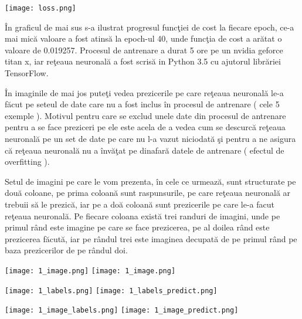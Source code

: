 \begin{center}
\texttt{[image: loss.png]}
\end{center}

\^{I}n graficul de mai sus s-a ilustrat progresul func\c{t}iei de cost la fiecare epoch, ce-a mai mic\u{a} valoare a fost atins\u{a} la epoch-ul 40, unde func\c{t}ia de cost a ar\u{a}tat o valoare de 0.019257. Procesul de antrenare a durat 5 ore pe un nvidia geforce titan x, iar re\c{t}eaua neuronal\u{a} a fost scris\u{a} in Python 3.5 cu ajutorul libr\u{a}riei TensorFlow.

\^{I}n imaginile de mai jos pute\c{t}i vedea prezicerile pe care re\c{t}eaua neuronal\u{a} le-a f\u{a}cut pe seteul de date care nu a fost inclus \^{i}n procesul de antrenare ( cele 5 exemple ). Motivul pentru care se exclud unele date din procesul de antrenare pentru a se face preziceri pe ele este acela de a vedea cum se descurc\u{a} re\c{t}eaua neuronal\u{a} pe un set de date pe care nu l-a vazut niciodat\u{a} \c{s}i pentru a ne asigura c\u{a} re\c{t}eaua neuronal\u{a} nu a \^{i}nv\u{a}\c{t}at pe dinafar\u{a} datele de antrenare ( efectul de overfitting ).

\par

Setul de imagini pe care le vom prezenta, \^{i}n cele ce urmeaz\u{a}, sunt structurate pe dou\u{a} coloane, pe prima coloan\u{a} sunt raspunsurile, pe care re\c{t}eaua neuronal\u{a} ar trebuii s\u{a} le prezic\u{a}, iar pe a do\u{a} coloan\u{a} sunt prezicerile pe care le-a facut re\c{t}eaua neuronal\u{a}. Pe fiecare coloana exist\u{a} trei randuri de imagini, unde pe primul r\^{a}nd este imagine pe care se face prezicerea, pe al doilea r\^{a}nd este prezicerea f\u{a}cut\u{a}, iar pe r\^{a}ndul trei este imaginea decupat\u{a} de pe primul r\^{a}nd pe baza prezicerilor de pe r\^{a}ndul doi.

\begin{center}
\texttt{[image: 1\_image.png]}
\texttt{[image: 1\_image.png]}
\end{center}

\begin{center}
\texttt{[image: 1\_labels.png]}
\texttt{[image: 1\_labels\_predict.png]}
\end{center}

\begin{center}
\texttt{[image: 1\_image\_labels.png]}
\texttt{[image: 1\_image\_predict.png]}
\end{center}

